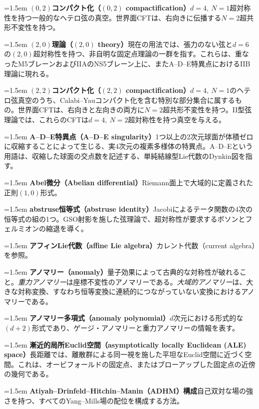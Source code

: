 \newcommand{\gloss}[2]{%
  \par\medskip\begingroup
  \hangindent=1.5em
  \noindent\textbf{#1}\quad #2\par
  \endgroup
}

\gloss{$(0,2)$コンパクト化（$(0,2)$ compactification）}
{$d=4,\ N=1$超対称性を持つ一般的なヘテロ弦の真空。世界面CFTは、右向きに伝播する$N=2$超共形不変性を持つ。}

\gloss{$(2,0)$理論（$(2,0)$ theory）}
{現在の用法では、張力のない弦と$d=6$の$(2,0)$超対称性を持つ、非自明な固定点理論の一群を指す。これらは、重なったM5ブレーンおよびIIAのNS5ブレーン上に、またA--D--E特異点におけるIIB理論に現れる。}

\gloss{$(2,2)$コンパクト化（$(2,2)$ compactification）}
{$d=4,\ N=1$のヘテロ弦真空のうち、Calabi--Yauコンパクト化を含む特別な部分集合に属するもの。世界面CFTは、右向きと左向きの両方に$N=2$超共形不変性を持つ。II型弦理論では、これらのCFTは$d=4,\ N=2$超対称性を持つ真空を与える。}

\gloss{A--D--E特異点（A--D--E singularity）}
{1つ以上の2次元球面が体積ゼロに収縮することによって生じる、実4次元の複素多様体の特異点。A--D--Eという用語は、収縮した球面の交点数を記述する、単純結線型Lie代数のDynkin図を指す。}

\gloss{Abel微分（Abelian differential）}
{Riemann面上で大域的に定義された正則$(1,0)$形式。}

\gloss{abstruse恒等式（abstruse identity）}
{Jacobiによるテータ関数の4次の恒等式の組の1つ。GSO射影を施した弦理論で、超対称性が要求するボソンとフェルミオンの縮退を導く。}

\gloss{アフィンLie代数（affine Lie algebra）}{カレント代数（current algebra）を参照。}

\gloss{アノマリー（anomaly）}
{量子効果によって古典的な対称性が破れること。\emph{重力アノマリー}は座標不変性のアノマリーである。\emph{大域的アノマリー}は、大きな対称変換、すなわち恒等変換に連続的につながっていない変換におけるアノマリーである。}

\gloss{アノマリー多項式（anomaly polynomial）}
{$d$次元における形式的な$(d+2)$形式であり、ゲージ・アノマリーと重力アノマリーの情報を表す。}

\gloss{漸近的局所Euclid空間（asymptotically locally Euclidean (ALE) space）}
{長距離では、離散群による同一視を施した平坦なEuclid空間に近づく空間。これは、オービフォールドの固定点、またはブローアップした固定点の近傍の幾何である。}

\gloss{Atiyah--Drinfeld--Hitchin--Manin（ADHM）構成}
{自己双対な場の強さを持つ、すべてのYang--Mills場の配位を構成する方法。}

